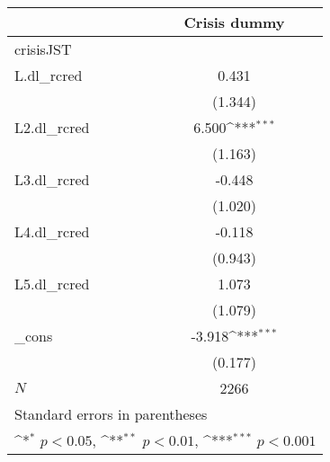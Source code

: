 {
\def\sym#1{\ifmmode^{#1}\else\(^{#1}\)\fi}
\begin{tabular}{l*{1}{c}}
\hline\hline
            &\multicolumn{1}{c}{Crisis dummy}\\
\hline
crisisJST   &                     \\
L.dl\_rcred  &       0.431         \\
            &     (1.344)         \\
[1em]
L2.dl\_rcred &       6.500\sym{***}\\
            &     (1.163)         \\
[1em]
L3.dl\_rcred &      -0.448         \\
            &     (1.020)         \\
[1em]
L4.dl\_rcred &      -0.118         \\
            &     (0.943)         \\
[1em]
L5.dl\_rcred &       1.073         \\
            &     (1.079)         \\
[1em]
\_cons      &      -3.918\sym{***}\\
            &     (0.177)         \\
\hline
\(N\)       &        2266         \\
\hline\hline
\multicolumn{2}{l}{\footnotesize Standard errors in parentheses}\\
\multicolumn{2}{l}{\footnotesize \sym{*} \(p<0.05\), \sym{**} \(p<0.01\), \sym{***} \(p<0.001\)}\\
\end{tabular}
}
